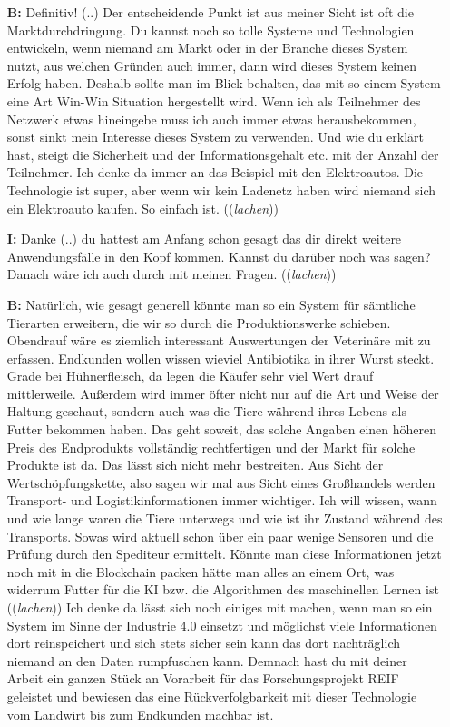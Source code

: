 \begin{itemize}
  \item[\textbf{B:}] Definitiv! (..) Der entscheidende Punkt ist aus meiner Sicht ist oft die Marktdurchdringung. Du kannst noch so tolle Systeme und Technologien entwickeln, wenn niemand am Markt oder in der Branche dieses System nutzt, aus welchen Gründen auch immer, dann wird dieses System keinen Erfolg haben. Deshalb sollte man im Blick behalten, das mit so einem System eine Art \glqq Win-Win\grqq{} Situation hergestellt wird. Wenn ich als Teilnehmer des Netzwerk etwas hineingebe muss ich auch immer etwas herausbekommen, sonst sinkt mein Interesse dieses System zu verwenden. Und wie du erklärt hast, steigt die Sicherheit und der Informationsgehalt etc. mit der Anzahl der Teilnehmer. Ich denke da immer an das Beispiel mit den Elektroautos. Die Technologie ist super, aber wenn wir kein Ladenetz haben wird niemand sich ein Elektroauto kaufen. So einfach ist. ((\textit{lachen}))
  \item[\textbf{I:}] Danke (..) du hattest am Anfang schon gesagt das dir direkt weitere Anwendungsfälle in den Kopf kommen. Kannst du darüber noch was sagen? Danach wäre ich auch durch mit meinen Fragen. ((\textit{lachen}))
  \item[\textbf{B:}] Natürlich, wie gesagt generell könnte man so ein System für sämtliche Tierarten erweitern, die wir so durch die Produktionswerke schieben. Obendrauf wäre es ziemlich interessant Auswertungen der Veterinäre mit zu erfassen. Endkunden wollen wissen wieviel Antibiotika in ihrer Wurst steckt. Grade bei Hühnerfleisch, da legen die Käufer sehr viel Wert drauf mittlerweile. Außerdem wird immer öfter nicht nur auf die Art und Weise der Haltung geschaut, sondern auch was die Tiere während ihres Lebens als Futter bekommen haben. Das geht soweit, das solche Angaben einen höheren Preis des Endprodukts vollständig rechtfertigen und der Markt für solche Produkte ist da. Das lässt sich nicht mehr bestreiten. Aus Sicht der Wertschöpfungskette, also sagen wir mal aus Sicht eines Großhandels werden Transport- und Logistikinformationen immer wichtiger. Ich will wissen, wann und wie lange waren die Tiere unterwegs und wie ist ihr Zustand während des Transports. Sowas wird aktuell schon über ein paar wenige Sensoren und die Prüfung durch den Spediteur ermittelt. Könnte man diese Informationen jetzt noch mit in die Blockchain packen hätte man alles an einem Ort, was widerrum Futter für die KI bzw. die Algorithmen des maschinellen Lernen ist ((\textit{lachen})) Ich denke da lässt sich noch einiges mit machen, wenn man so ein System im Sinne der Industrie 4.0 einsetzt und möglichst viele Informationen dort reinspeichert und sich stets sicher sein kann das dort nachträglich niemand an den Daten rumpfuschen kann. Demnach hast du mit deiner Arbeit ein ganzen Stück an Vorarbeit für das Forschungsprojekt REIF geleistet und bewiesen das eine Rückverfolgbarkeit mit dieser Technologie vom Landwirt bis zum Endkunden machbar ist.
\end{itemize}

\newpage

